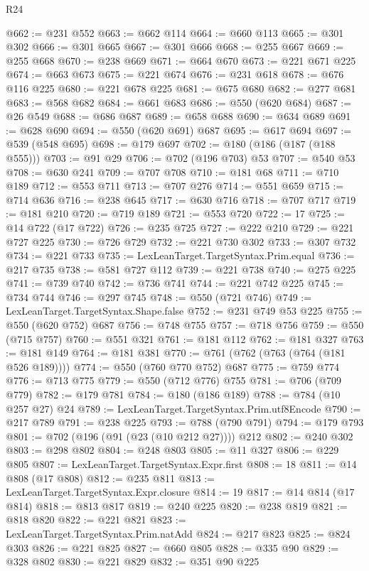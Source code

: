 \begin{lexlean}{R24}
\begin{coremodule}
@662 := @231 @552
@663 := @662 @114
@664 := @660 @113
@665 := @301 @302
@666 := @301 @665
@667 := @301 @666
@668 := @255 @667
@669 := @255 @668
@670 := @238 @669
@671 := @664 @670
@673 := @221 @671 @225
@674 := @663 @673
@675 := @221 @674
@676 := @231 @618
@678 := @676 @116 @225
@680 := @221 @678 @225
@681 := @675 @680
@682 := @277 @681
@683 := @568 @682
@684 := @661 @683
@686 := @550 (@620 @684)
@687 := @26 @549
@688 := @686 @687
@689 := @658 @688
@690 := @634 @689
@691 := @628 @690
@694 := @550 (@620 @691) @687
@695 := @617 @694
@697 := @539 (@548 @695)
@698 := @179 @697
@702 := @180 (@186 (@187 (@188 @555)))
@703 := @91 @29
@706 := @702 (@196 @703) @53
@707 := @540 @53
@708 := @630 @241
@709 := @707 @708
@710 := @181 @68
@711 := @710 @189
@712 := @553 @711
@713 := @707 @276
@714 := @551 @659
@715 := @714 @636
@716 := @238 @645
@717 := @630 @716
@718 := @707 @717
@719 := @181 @210
@720 := @719 @189
@721 := @553 @720
@722 := 17
@725 := @14 @722 (@17 @722)
@726 := @235 @725
@727 := @222 @210
@729 := @221 @727 @225
@730 := @726 @729
@732 := @221 @730 @302
@733 := @307 @732
@734 := @221 @733
@735 := LexLeanTarget.TargetSyntax.Prim.equal
@736 := @217 @735
@738 := @581 @727 @112
@739 := @221 @738
@740 := @275 @225
@741 := @739 @740
@742 := @736 @741
@744 := @221 @742 @225
@745 := @734 @744
@746 := @297 @745
@748 := @550 (@721 @746)
@749 := LexLeanTarget.TargetSyntax.Shape.false
@752 := @231 @749 @53 @225
@755 := @550 (@620 @752) @687
@756 := @748 @755
@757 := @718 @756
@759 := @550 (@715 @757)
@760 := @551 @321
@761 := @181 @112
@762 := @181 @327
@763 := @181 @149
@764 := @181 @381
@770 := @761 (@762 (@763 (@764 (@181 @526 @189))))
@774 := @550 (@760 @770 @752) @687
@775 := @759 @774
@776 := @713 @775
@779 := @550 (@712 @776) @755
@781 := @706 (@709 @779)
@782 := @179 @781
@784 := @180 (@186 @189)
@788 := @784 (@10 @257 @27) @24
@789 := LexLeanTarget.TargetSyntax.Prim.utf8Encode
@790 := @217 @789
@791 := @238 @225
@793 := @788 (@790 @791)
@794 := @179 @793
@801 := @702 (@196 (@91 (@23 (@10 @212 @27)))) @212
@802 := @240 @302
@803 := @298 @802
@804 := @248 @803
@805 := @11 @327
@806 := @229 @805
@807 := LexLeanTarget.TargetSyntax.Expr.first
@808 := 18
@811 := @14 @808 (@17 @808)
@812 := @235 @811
@813 := LexLeanTarget.TargetSyntax.Expr.closure
@814 := 19
@817 := @14 @814 (@17 @814)
@818 := @813 @817
@819 := @240 @225
@820 := @238 @819
@821 := @818 @820
@822 := @221 @821
@823 := LexLeanTarget.TargetSyntax.Prim.natAdd
@824 := @217 @823
@825 := @824 @303
@826 := @221 @825
@827 := @660 @805
@828 := @335 @90
@829 := @328 @802
@830 := @221 @829
@832 := @351 @90 @225

\end{coremodule}
\end{lexlean}
